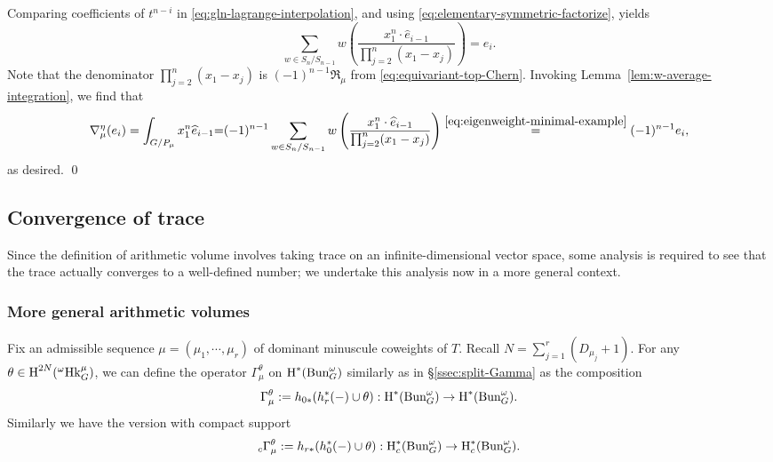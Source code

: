 \documentclass[reqno]{amsart}
\numberwithin{equation}{subsection}
\theoremstyle{definition}
\newcommand\frR{\mathfrak{R}}
\newcommand{\Bun}{\textup{Bun}}
\newcommand\Hk{\mathrm{Hk}}
\newcommand\Sht{\textup{Sht}}
\newcommand{\vol}{\textup{vol}}
\newcommand{\wt}[1]{\widetilde{#1}}
\newcommand{\wh}[1]{\widehat{#1}}
\newcommand{\cohog}[2]{\textup{H}^{#1}({#2})}     %
\newcommand{\cohoc}[2]{\textup{H}_{c}^{#1}({#2})}     %
\newcommand\G\Gamma
\renewcommand{\th}{\theta}
\newcommand{\om}{\omega}
\newcommand\nb{\nabla}
\begin{document}
Comparing coefficients of $t^{n-i}$ in \eqref{eq:gln-lagrange-interpolation}, and using \eqref{eq:elementary-symmetric-factorize}, yields
\begin{equation}\label{eq:eigenweight-minimal-example}
\sum_{w \in S_n/S_{n-1}} w \left(\frac{x_1^n \cdot  \wh{e}_{i-1}}{\prod_{j=2}^n (x_1-x_j) } \right) = e_i.
\end{equation}
Note that the denominator $\prod_{j=2}^n (x_1-x_j)$ is $(-1)^{n-1} \frR_\mu$ from \eqref{eq:equivariant-top-Chern}. Invoking Lemma~\ref{lem:w-average-integration}, we find that 
\begin{equation}\label{eq:integration-GLn-colength-one}
\nb_{\mu}^\eta(e_{i}) = \int_{G/P_\mu} x_1^n \wh{e}_{i-1} {=} (-1)^{n-1} \sum_{w \in S_n/S_{n-1}} w \left(\frac{x_1^n \cdot  \wh{e}_{i-1}}{\prod_{j=2}^n (x_1-x_j) } \right) \stackrel{\eqref{eq:eigenweight-minimal-example}}= (-1)^{n-1}e_i,
\end{equation}
as desired. \qed




\subsection{Convergence of trace} %

Since the definition of arithmetic volume involves taking trace on an infinite-dimensional vector space, some analysis is required to see that the trace actually converges to a well-defined number; we undertake this analysis now in a more general context. 


\subsubsection{More general arithmetic volumes}

Fix an admissible sequence $\mu=(\mu_1,\cdots, \mu_r)$ of dominant minuscule coweights of $T$. Recall $N=\sum_{j=1}^r(D_{\mu_j}+1)$. For any $\th\in \cohog{2N}{{}^\om\Hk^\mu_G}$, we can define the operator $\G^\th_\mu$ on $\cohog{*}{\Bun^\om_G}$ similarly as in \S\ref{ssec:split-Gamma} as the composition
\begin{equation*}
    \G^\th_\mu:=h_{0*}(h_r^*(-)\cup \th): \cohog{*}{\Bun^\om_G}\to \cohog{*}{\Bun^\om_G}.
\end{equation*}
Similarly we have the version with compact support
\begin{equation*}
    {}_c\G^\th_\mu:=h_{r*}(h_0^*(-)\cup \th): \cohoc{*}{\Bun^\om_G}\to \cohoc{*}{\Bun^\om_G}.
\end{equation*}
\end{document}
